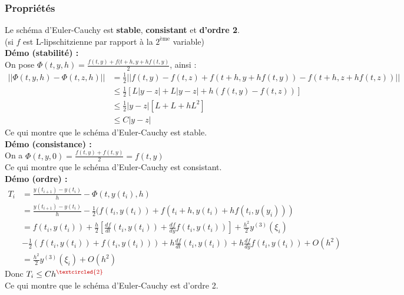 \documentclass[a4paper,10pt]{report}
\begin{document}
\subsubsection{Propriétés}
Le schéma d'Euler-Cauchy est \textbf{stable}, \textbf{consistant} et \textbf{d'ordre 2}.\\
(si $f$ est L-lipschitzienne par rapport à la $2^{\text{ème}}$ variable)  \\

\textbf{Démo (stabilité) :}\\
\indent On pose $\Phi(t,y,h)=\frac{f(t,y)+f(t+h,y+hf(t,y)}{2}$, ainsi :
\begin{align*}
||\Phi(t,y,h)-\Phi(t,z,h)|| & = \frac{1}{2}||f(t,y)-f(t,z)+f(t+h,y+hf(t,y))-f(t+h,z+hf(t,z))|| \\
							& \leq \frac{1}{2}\left[ L|y-z| + L{|y-z|+h(f(t,y)-f(t,z))} \right] \\
							& \leq \frac{1}{2}|y-z|\left[ L + L + hL^2 \right] \\
							& \leq C|y-z|
\end{align*}
\indent Ce qui montre que le schéma d'Euler-Cauchy est stable. \\

\textbf{Démo (consistance) :}\\
\indent On a $\Phi(t,y,0)=\frac{f(t,y)+f(t,y)}{2}=f(t,y)$\\
\indent Ce qui montre que le schéma d'Euler-Cauchy est consistant.\\

\textbf{Démo (ordre) :}\\
\begin{align*}
T_i & =\frac{y(t_{i+1})-y(t_i)}{h}-\Phi(t,y(t_i),h) \\
	& =\frac{y(t_{i+1})-y(t_i)}{h} - \frac{1}{2}(f(t_i,y(t_i))+f(t_i+h,y(t_i)+hf(t_i,y(y_i))) \\
	& = f(t_i,y(t_i))+\frac{h}{2}\left[ \frac{df}{dt}(t_i,y(t_i)) + \frac{df}{dy}f(t_i,y(t_i)) \right] + \frac{h^2}{2}y^{(3)}(\xi_i)\\
	& - \frac{1}{2}(f(t_i,y(t_i))+f(t_i,y(t_i))) + h\frac{df}{dt}(t_i,y(t_i)) + h\frac{df}{dy}f(t_i,y(t_i)) + O(h^2) \\
	& = \frac{h^2}{2}y^{(3)}(\xi_i) + O(h^2)
\end{align*}
\indent Donc $T_i \leq Ch^{\textcolor{red}{\textcircled{\scriptsize 2}}}$ \\
\indent Ce qui montre que le schéma d'Euler-Cauchy est d'ordre 2.\\ \\
\end{document}
